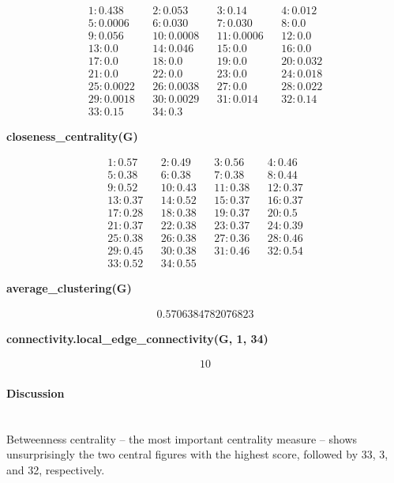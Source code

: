 \documentclass[11pt]{article}
\begin{document}
\begin{align*}
1: 0.438 && 2: 0.053 && 3: 0.14 && 4: 0.012 \\
5: 0.0006 && 6: 0.030 && 7: 0.030 && 8: 0.0 \\
9: 0.056 && 10: 0.0008 && 11: 0.0006 && 12: 0.0 \\
13: 0.0 && 14: 0.046 && 15: 0.0 && 16: 0.0 \\
17: 0.0 && 18: 0.0 && 19: 0.0 && 20: 0.032 \\
21: 0.0 && 22: 0.0 && 23: 0.0 && 24: 0.018 \\
25: 0.0022 && 26: 0.0038 && 27: 0.0 && 28: 0.022 \\
29: 0.0018 && 30: 0.0029 && 31: 0.014 && 32: 0.14 \\
33: 0.15 && 34: 0.3 && && 
\end{align*}

\textbf{closeness\_centrality(G)}

\begin{align*}
1: 0.57 &&  2: 0.49 && 3: 0.56 && 4: 0.46 \\
5: 0.38 && 6: 0.38 && 7: 0.38 && 8: 0.44 \\
9: 0.52 && 10: 0.43 && 11: 0.38 && 12: 0.37 \\
13: 0.37 && 14: 0.52 && 15: 0.37 && 16: 0.37 \\
17: 0.28 && 18: 0.38 && 19: 0.37 && 20: 0.5 \\
21: 0.37 && 22: 0.38 && 23: 0.37 && 24: 0.39 \\
25: 0.38 && 26: 0.38 && 27: 0.36 && 28: 0.46 \\
29: 0.45 && 30: 0.38 && 31: 0.46 && 32: 0.54 \\
33: 0.52 && 34: 0.55 && &&
\end{align*}

\textbf{average\_clustering(G)}

\begin{align*}0.5706384782076823\end{align*}

\textbf{connectivity.local\_edge\_connectivity(G, 1, 34)}

\begin{align*}10\end{align*}

\paragraph{Discussion} \hspace{0pt} \\
Betweenness centrality -- the most important centrality measure -- shows unsurprisingly
the two central figures with the highest score, followed by 33, 3, and 32, respectively.
\end{document}
